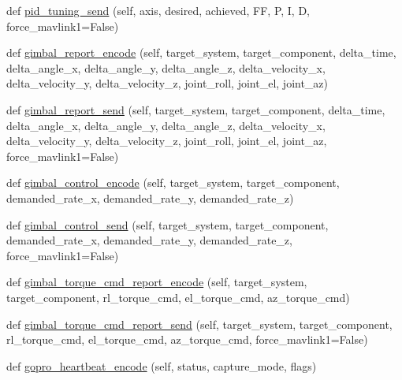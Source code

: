 \begin{DoxyCompactItemize}
\item 
def \hyperlink{classpymavlink_1_1dialects_1_1v10_1_1MAVLink_a6b5e2d6bad9cf417fa0bb0674b021d4c}{pid\+\_\+tuning\+\_\+send} (self, axis, desired, achieved, FF, P, I, D, force\+\_\+mavlink1=False)
\item 
def \hyperlink{classpymavlink_1_1dialects_1_1v10_1_1MAVLink_ac3561e3db2717234632a78c8d0d04088}{gimbal\+\_\+report\+\_\+encode} (self, target\+\_\+system, target\+\_\+component, delta\+\_\+time, delta\+\_\+angle\+\_\+x, delta\+\_\+angle\+\_\+y, delta\+\_\+angle\+\_\+z, delta\+\_\+velocity\+\_\+x, delta\+\_\+velocity\+\_\+y, delta\+\_\+velocity\+\_\+z, joint\+\_\+roll, joint\+\_\+el, joint\+\_\+az)
\item 
def \hyperlink{classpymavlink_1_1dialects_1_1v10_1_1MAVLink_a2f0b103d7f2945770e05ee093877f124}{gimbal\+\_\+report\+\_\+send} (self, target\+\_\+system, target\+\_\+component, delta\+\_\+time, delta\+\_\+angle\+\_\+x, delta\+\_\+angle\+\_\+y, delta\+\_\+angle\+\_\+z, delta\+\_\+velocity\+\_\+x, delta\+\_\+velocity\+\_\+y, delta\+\_\+velocity\+\_\+z, joint\+\_\+roll, joint\+\_\+el, joint\+\_\+az, force\+\_\+mavlink1=False)
\item 
def \hyperlink{classpymavlink_1_1dialects_1_1v10_1_1MAVLink_af1be95e61d1e7f5c24596a17c3be0868}{gimbal\+\_\+control\+\_\+encode} (self, target\+\_\+system, target\+\_\+component, demanded\+\_\+rate\+\_\+x, demanded\+\_\+rate\+\_\+y, demanded\+\_\+rate\+\_\+z)
\item 
def \hyperlink{classpymavlink_1_1dialects_1_1v10_1_1MAVLink_a276bf2c6e2b1e1e983e30a4eede1ba5c}{gimbal\+\_\+control\+\_\+send} (self, target\+\_\+system, target\+\_\+component, demanded\+\_\+rate\+\_\+x, demanded\+\_\+rate\+\_\+y, demanded\+\_\+rate\+\_\+z, force\+\_\+mavlink1=False)
\item 
def \hyperlink{classpymavlink_1_1dialects_1_1v10_1_1MAVLink_a11c690643a3ce97e315390a666035d93}{gimbal\+\_\+torque\+\_\+cmd\+\_\+report\+\_\+encode} (self, target\+\_\+system, target\+\_\+component, rl\+\_\+torque\+\_\+cmd, el\+\_\+torque\+\_\+cmd, az\+\_\+torque\+\_\+cmd)
\item 
def \hyperlink{classpymavlink_1_1dialects_1_1v10_1_1MAVLink_af292e66a7ece3fc5638334c75b937646}{gimbal\+\_\+torque\+\_\+cmd\+\_\+report\+\_\+send} (self, target\+\_\+system, target\+\_\+component, rl\+\_\+torque\+\_\+cmd, el\+\_\+torque\+\_\+cmd, az\+\_\+torque\+\_\+cmd, force\+\_\+mavlink1=False)
\item 
def \hyperlink{classpymavlink_1_1dialects_1_1v10_1_1MAVLink_a9107ccb0c16f991218581e0bc37c8f84}{gopro\+\_\+heartbeat\+\_\+encode} (self, status, capture\+\_\+mode, flags)

\end{DoxyCompactItemize}
